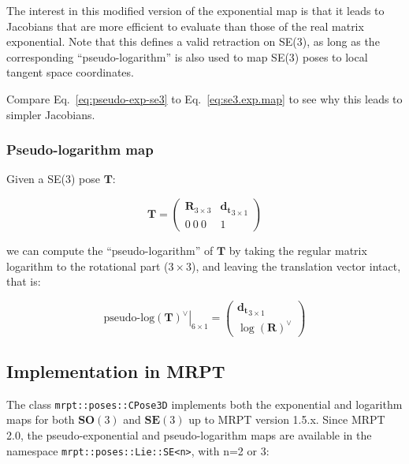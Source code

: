 \documentclass[a4paper,11pt]{report}
\begin{document}
The interest in this modified version of the exponential map 
is that it leads to Jacobians that are more efficient to evaluate
than those of the real matrix exponential.
Note that this defines a valid retraction on SE(3), as long as the corresponding ``pseudo-logarithm'' 
is also used to map SE(3) poses to local tangent space coordinates.

Compare Eq.~\ref{eq:pseudo-exp-se3} to Eq.~\ref{eq:se3.exp.map} to see why this leads to simpler Jacobians.



\subsubsection{Pseudo-logarithm map}
\label{sect:se3_pseudo-log}

Given a SE(3) pose $\mathbf{T}$: 

\begin{equation}
\mathbf{T} =
\left(
\begin{array}{c|c}
 \mathbf{R}_{3 \times 3}  & \mathbf{d_{t}}_{3 \times 1}  \\
\hline
  0 ~ 0 ~ 0 & 1
\end{array}
\right)
\end{equation}

\noindent we can compute the ``pseudo-logarithm'' of $\mathbf{T}$
by taking the regular matrix logarithm to the rotational part ($3 \times 3$), and leaving the translation vector intact, that is: 

\begin{equation}
\label{eq:pseudo-log-se3}
\left. \text{pseudo-log}(\mathbf{T})^\vee \right|_{6 \times 1} = 
\left(
\begin{array}{c}
\mathbf{d_{t}}_{3 \times 1} \\
\log(\mathbf{R})^\vee
\end{array}
\right)
\end{equation}


\subsection{Implementation in MRPT}

The class \texttt{mrpt::poses::CPose3D} implements both the exponential and logarithm
maps for both $\mathbf{SO}(3)$ and $\mathbf{SE}(3)$
up to MRPT version 1.5.x. Since MRPT 2.0, the pseudo-exponential and pseudo-logarithm 
maps are available in the namespace 
\texttt{mrpt::poses::Lie::SE<n>}, with n=2 or 3:
\end{document}
